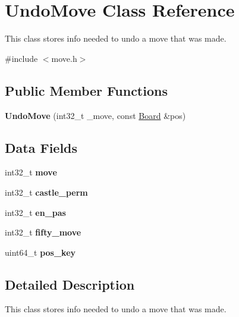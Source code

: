 \hypertarget{classUndoMove}{}\section{Undo\+Move Class Reference}
\label{classUndoMove}


This class stores info needed to undo a move that was made.  




{\ttfamily \#include $<$move.\+h$>$}

\subsection*{Public Member Functions}
\begin{DoxyCompactItemize}
\item 
\mbox{\label{classUndoMove_a3de052beeee8272912fba95e1f097c15}} 
{\bfseries Undo\+Move} (int32\+\_\+t \+\_\+move, const \mbox{\hyperlink{classBoard}{Board}} \&pos)
\end{DoxyCompactItemize}
\subsection*{Data Fields}
\begin{DoxyCompactItemize}
\item 
\mbox{\label{classUndoMove_a829f8e9963dac72b42c166ab62cc9bca}} 
int32\+\_\+t {\bfseries move}
\item 
\mbox{\label{classUndoMove_ae1ea12b372aff6f9636c2c185f7ec1c1}} 
int32\+\_\+t {\bfseries castle\+\_\+perm}
\item 
\mbox{\label{classUndoMove_a801d7c221484ce9e9d70c16c8d0a5749}} 
int32\+\_\+t {\bfseries en\+\_\+pas}
\item 
\mbox{\label{classUndoMove_ac4e428deda8affe8713ab5f9fb0d9d5b}} 
int32\+\_\+t {\bfseries fifty\+\_\+move}
\item 
\mbox{\label{classUndoMove_ae03b245ae0d4c790ad8c7077a837ec14}} 
uint64\+\_\+t {\bfseries pos\+\_\+key}
\end{DoxyCompactItemize}


\subsection{Detailed Description}
This class stores info needed to undo a move that was made. 

